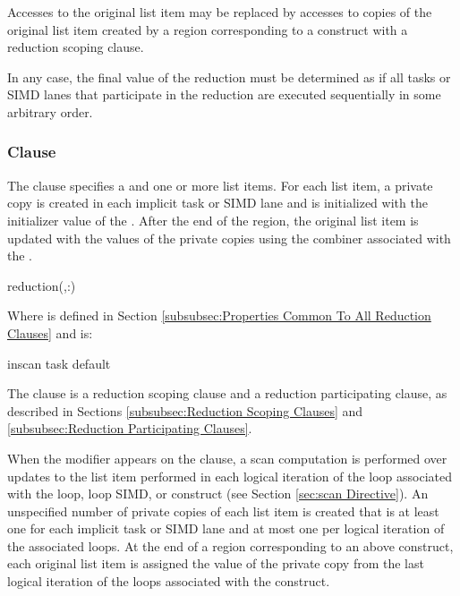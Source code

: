 Accesses to the original list item may be replaced by accesses to copies of the
original list item created by a region corresponding to a construct with a
reduction scoping clause.

In any case, the final value of the reduction must be determined as if all tasks
or SIMD lanes that participate in the reduction are executed sequentially in
some arbitrary order.










\subsubsection{ Clause}
\label{subsubsec:reduction clause}
\summary
The  clause specifies a  and one or
more list items. For each list item, a private copy is created in each implicit
task or SIMD lane and is initialized with the initializer value of the
. After the end of the region, the original list item
is updated with the values of the private copies using the combiner associated
with the .

\syntax
\begin{ompSyntax}
reduction(\plc{[reduction-modifier},\plc{] }:)
\end{ompSyntax}

Where  is defined in Section
\ref{subsubsec:Properties Common To All Reduction Clauses} and
 is:
\begin{indentedcodelist}
inscan
task
default
\end{indentedcodelist}

\descr
The  clause is a reduction scoping clause and a reduction
participating clause, as described in Sections \ref{subsubsec:Reduction Scoping
Clauses} and \ref{subsubsec:Reduction Participating Clauses}. 

When the  modifier appears on the clause, a scan computation is
performed over updates to the list item performed in each logical iteration of
the loop associated with the loop, loop SIMD, or  construct (see
Section \ref{sec:scan Directive}).  An unspecified number of private copies of
each list item is created that is at least one for each implicit task or SIMD
lane and at most one per logical iteration of the associated loops. At the end
of a region corresponding to an above construct, each original list item is
assigned the value of the private copy from the last logical iteration of the
loops associated with the construct.
   
